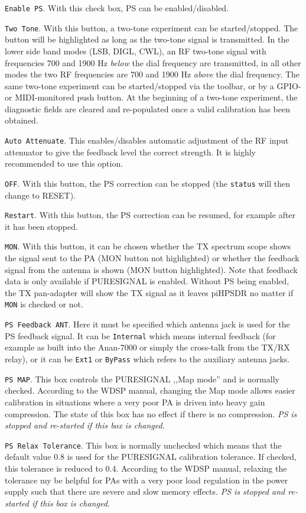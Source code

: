 \documentclass[12pt]{book}
\def\rett#1{\texttt{\color{red}#1}}
\def\pH{pi\-HPSDR\xspace}
\begin{document}
\rett{Enable PS}. With this check box, PS can be enabled/disabled.

\rett{Two Tone}. With this button, a two-tone experiment can be started/stopped. The button
will be highlighted as long as the two-tone signal is transmitted. In the lower side band
modes (LSB, DIGL, CWL), an RF two-tone signal with frequencies 700 and 1900 Hz
\textit{below} the dial frequency are transmitted, in all other modes the two
RF frequencies are 700 and 1900 Hz \textit{above} the dial frequency. The same two-tone
experiment can be started/stopped via the toolbar, or by a GPIO- or MIDI-monitored
push button. At the beginning of a two-tone experiment, the diagnostic fields
are cleared and re-populated once a valid calibration has been obtained.

\rett{Auto Attenuate}. This enables/disables automatic adjustment of the RF input
attenuator to give the feedback level the correct strength. It is highly recommended
to use this option.

\rett{OFF}. With this button, the PS correction can be stopped (the \rett{status} will
then change to RESET).

\rett{Restart}. With this button, the PS correction can be resumed, for example after
it has been stopped.

\rett{MON}. With this button, it can be chosen whether the TX spectrum scope shows
the signal sent to the PA (MON button not highlighted) or whether the feedback signal
from the antenna is shown (MON button highlighted). Note that feedback data is only
available if PURESIGNAL is enabled. Without PS being enabled, the TX pan-adapter will
show the TX signal as it leaves \pH no matter if \rett{MON} is checked or not.

\rett{PS Feedback ANT}. Here it must be specified which antenna jack is used for the
PS feedback signal. It can be \rett{Internal} which means internal feedback
(for example as built into the Anan-7000 or  simply the cross-talk from the
TX/RX relay), or it can be \rett{Ext1} or \rett{ByPass} which refers to the
auxiliary antenna jacks.

\rett{PS MAP}. This box controls the PURESIGNAL ,,Map mode'' and is normally checked.
According to the WDSP manual, changing the Map mode allows easier calibration in
situations where a very poor PA is driven into heavy gain compression. The state
of this box has
no effect if there is no compression. \textit{PS is stopped and re-started if
this box is changed.}

\rett{PS Relax Tolerance}. This box is normally unchecked which means that the default
value 0.8 is used for the PURESIGNAL calibration tolerance. If checked, this tolerance
is reduced to 0.4. According to the WDSP manual, relaxing the tolerance my be helpful
for PAs with a very poor load regulation in the power supply such that there are
severe and slow memory effects. \textit{PS is stopped and re-started if
this box is changed.}
\end{document}
